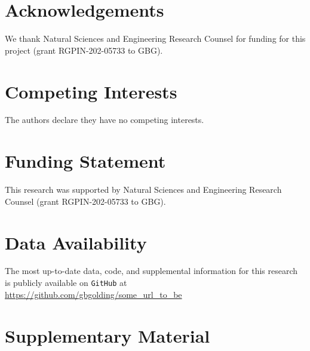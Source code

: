 \documentclass[a4paper,12pt]{article}
\begin{document}
\begin{multicols}{2}
\section*{Acknowledgements}
We thank Natural Sciences and Engineering Research Counsel for funding
for this project (grant RGPIN-202-05733 to GBG).

\section*{Competing Interests}
The authors declare they have no competing interests.

\section*{Funding Statement}
This research was supported by Natural Sciences and Engineering Research
Counsel (grant RGPIN-202-05733 to GBG).

\section*{Data Availability}
The most up-to-date data, code, and supplemental information
for this research is publicly available on \texttt{GitHub} at
\textcolor{red}{\url{https://github.com/gbgolding/some_url_to_be}}

\let\oldUrl\url
\renewcommand{\url}[1]{\href{#1}{Link}}

\small
\printbibliography
\normalsize
\end{multicols}
\newpage
\section*{Supplementary Material}
        \setcounter{table}{0}
        \renewcommand{\thetable}{S\arabic{table}}
        \setcounter{figure}{0}
        \renewcommand{\thefigure}{S\arabic{figure}}
        \setcounter{equation}{0}
        \renewcommand{\theequation}{S\arabic{equation}}
\end{document}
